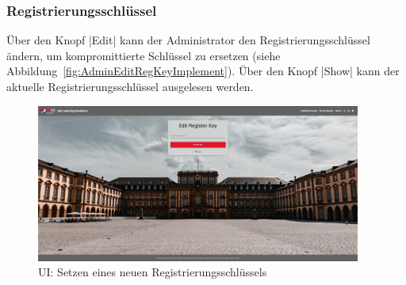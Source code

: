 \subsubsection*{Registrierungsschlüssel \faKey}

Über den Knopf \jinline|Edit| kann der Administrator den Registrierungsschlüssel ändern, um kompromittierte Schlüssel zu ersetzen (siehe Abbildung~\vref{fig:AdminEditRegKeyImplement}). 
Über den Knopf \jinline|Show|\xspace kann der aktuelle Registrierungsschlüssel ausgelesen werden. 

\begin{figure}[h]
	\centering
	\includegraphics[width=0.95\textwidth, keepaspectratio]{img/client/EditSurveyMasterKey.png}
	\captionsetup{justification=centering, format=plain}
	\caption[\acl{UI}: Setzen eines neuen Registrierungsschlüssels]{\acl{UI}: Setzen eines neuen Registrierungsschlüssels \\ \quelleScreenshot}
	\label{fig:AdminEditRegKeyImplement}
\end{figure}
